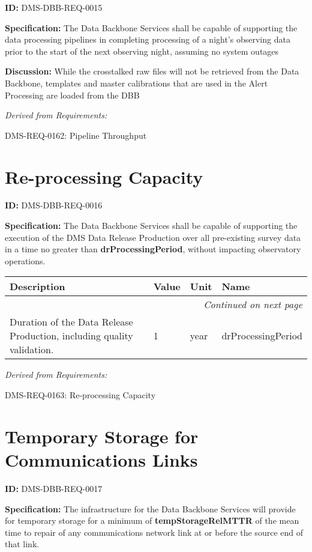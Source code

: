 \documentclass[SE,toc,lsstdraft]{lsstdoc}
\makeatletter
\newcommand{\paramname}[1]{\hspace{0pt}#1}
\newcommand{\unitname}[1]{\hspace{0pt}#1}
\newenvironment{parameters}[0]{%
\setlength\LTleft{0pt}
\setlength\LTright{\fill}
\begin{small}
\begin{longtable}[]{|p{0.49\textwidth}|l|p{0.6in}|p{1.70in}@{}|}

\hline \textbf{Description} & \textbf{Value} & \textbf{Unit} & \textbf{Name} \\ \hline
\endhead

\hline \multicolumn{4}{r}{\emph{Continued on next page}} \\
\endfoot

\hline\hline
\endlastfoot
}{%
\hline
\end{longtable}
\end{small}
}
\makeatother
\begin{document}
\label{DMS-DBB-REQ-0015}
\textbf{ID:} DMS-DBB-REQ-0015

\textbf{Specification:}
The Data Backbone Services shall be capable of supporting the data processing pipelines in completing processing of a night’s observing data prior to the start of the next observing night, assuming no system outages

\textbf{Discussion:}
While the crosstalked raw files will not be retrieved from the Data Backbone, templates and master calibrations that are used in the Alert Processing are loaded from the DBB

\emph{Derived from Requirements:}

DMS-REQ-0162:
Pipeline Throughput \newline

\section{Re-processing Capacity}

\label{DMS-DBB-REQ-0016}
\textbf{ID:} DMS-DBB-REQ-0016

\textbf{Specification:}
The Data Backbone Services shall be capable of supporting the execution of the DMS Data Release Production over all pre-existing survey data in a time no greater than \textbf{drProcessingPeriod}, without impacting observatory operations.

\begin{parameters}
Duration of the Data Release Production, including quality validation.
&
1
&
\unitname{%
year
}
&
\paramname{%
drProcessingPeriod
} \\\hline
\end{parameters}

\emph{Derived from Requirements:}

DMS-REQ-0163:
Re-processing Capacity \newline

\section{Temporary Storage for Communications Links}

\label{DMS-DBB-REQ-0017}
\textbf{ID:} DMS-DBB-REQ-0017

\textbf{Specification:}
The infrastructure for the Data Backbone Services will provide for temporary storage for a minimum of \textbf{tempStorageRelMTTR} of the mean time to repair of any communications network link at or before the source end of that link.
\end{document}
